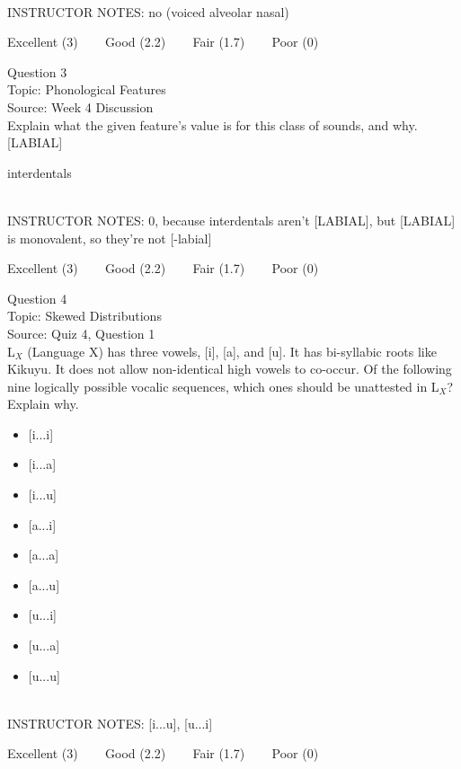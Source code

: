 \documentclass[12pt]{article}
\begin{document}
~\\
INSTRUCTOR NOTES: no (voiced alveolar nasal)


\vfill
Excellent (3) ~~~ Good (2.2) ~~~ Fair (1.7) ~~~ Poor (0)
\newpage

{\large Question 3}\\

Topic: Phonological Features\\
Source: Week 4 Discussion\\

Explain what the given feature’s value is for this class of sounds, and why.\\

{[LABIAL]}

interdentals


~\\
INSTRUCTOR NOTES: 0, because interdentals aren't [LABIAL], but [LABIAL] is monovalent, so they're not [-labial]


\vfill
Excellent (3) ~~~ Good (2.2) ~~~ Fair (1.7) ~~~ Poor (0)
\newpage

{\large Question 4}\\

Topic: Skewed Distributions\\
Source: Quiz 4, Question 1\\

L$_X$ (Language X) has three vowels, [i], [a], and [u]. It has bi-syllabic roots like Kikuyu. It does not allow non-identical high vowels to co-occur. Of the following nine logically possible vocalic sequences, which ones should be unattested in L$_X$? Explain why.\\

\begin{itemize} \item {[i...i]} \item {[i...a]} \item {[i...u]} \item {[a...i]} \item {[a...a]} \item {[a...u]} \item {[u...i]} \item {[u...a]} \item {[u...u]} \end{itemize}


~\\
INSTRUCTOR NOTES: [i...u], [u...i]


\vfill
Excellent (3) ~~~ Good (2.2) ~~~ Fair (1.7) ~~~ Poor (0)
\newpage
\end{document}

